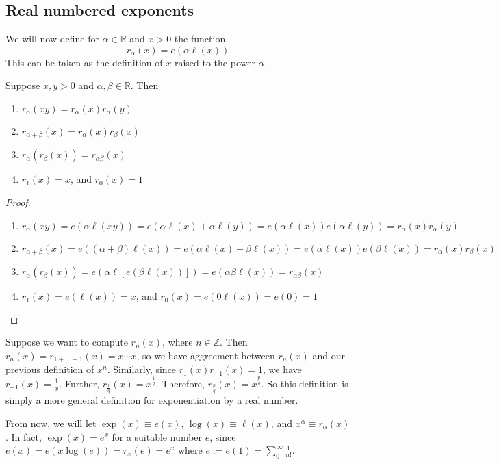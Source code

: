 \subsection{Real numbered exponents}
We will now define for \(\alpha \in \mathbb R\) and \(x > 0\) the function
\[
	r_\alpha(x) = e(\alpha \ell(x))
\]
This can be taken as the definition of \(x\) raised to the power \(\alpha\).
\begin{theorem}
	Suppose \(x, y > 0\) and \(\alpha, \beta \in \mathbb R\).
	Then
	\begin{enumerate}
		\item \(r_\alpha(xy) = r_\alpha(x)r_\alpha(y)\)
		\item \(r_{\alpha + \beta}(x) = r_\alpha(x) r_\beta(x)\)
		\item \(r_\alpha(r_\beta(x)) = r_{\alpha\beta}(x)\)
		\item \(r_1(x) = x\), and \(r_0(x) = 1\)
	\end{enumerate}
\end{theorem}
\begin{proof}
	\begin{enumerate}
		\item \(r_\alpha(xy) = e(\alpha \ell(xy)) = e(\alpha \ell(x) + \alpha \ell(y)) = e(\alpha \ell(x))e(\alpha\ell(y)) = r_\alpha(x)r_\alpha(y)\)
		\item \(r_{\alpha + \beta}(x) = e((\alpha + \beta) \ell(x)) = e(\alpha\ell(x) + \beta\ell(x)) = e(\alpha\ell(x))e(\beta\ell(x)) = r_\alpha(x) r_\beta(x)\)
		\item \(r_\alpha(r_\beta(x)) = e(\alpha \ell[e(\beta \ell(x))]) = e(\alpha \beta \ell(x)) = r_{\alpha\beta}(x)\)
		\item \(r_1(x) = e(\ell(x)) = x\), and \(r_0(x) = e(0 \ell(x)) = e(0) = 1\)
	\end{enumerate}
\end{proof}
\noindent Suppose we want to compute \(r_n(x)\), where \(n \in\mathbb Z\).
Then \(r_n(x) = r_{1 + \dots + 1}(x) = x \cdots x\), so we have aggreement between \(r_n(x)\) and our previous definition of \(x^n\).
Similarly, since \(r_1(x) r_{-1}(x) = 1\), we have \(r_{-1}(x) = \frac{1}{x}\).
Further, \(r_{\frac{1}{q}}(x) = x^\frac{1}{q}\).
Therefore, \(r_{\frac{p}{q}}(x) = x^{\frac{p}{q}}\).
So this definition is simply a more general definition for exponentiation by a real number.

From now, we will let \(\exp(x) \equiv e(x)\), \(\log(x) \equiv \ell(x)\), and \(x^\alpha \equiv r_\alpha(x)\).
In fact, \(\exp(x) = e^x\) for a suitable number \(e\), since \(e(x) = e(x \log(e)) = r_x(e) = e^x\) where \(e := e(1) = \sum_0^\infty \frac{1}{n!}\).

